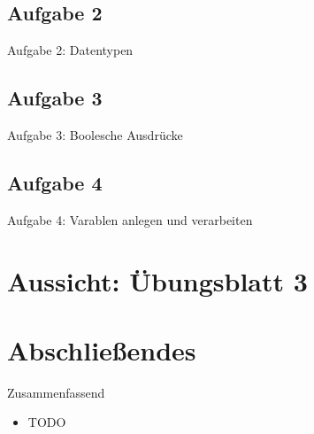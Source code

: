 \subsection{Aufgabe 2}
\begin{frame}{Aufgabe 2: Datentypen}

\end{frame}

\subsection{Aufgabe 3}
\begin{frame}{Aufgabe 3: Boolesche Ausdrücke}

\end{frame}

\subsection{Aufgabe 4}
\begin{frame}{Aufgabe 4: Varablen anlegen und verarbeiten}

\end{frame}

\section{Aussicht: Übungsblatt 3}
\begin{frame}

\end{frame}

\section{Abschließendes}
{\SummaryFrame
\begin{frame}[t]{Zusammenfassend}
\pause \printBibCommand
\vfill\vfill %
\begin{itemize}[<+(1)->]
    \itemsep14pt
    \item TODO
\end{itemize}
\end{frame}
}

\outro{\vskip6mm\centering\begin{tikzpicture}[scale=2.5]
\end{tikzpicture}}


\iffull\fi
